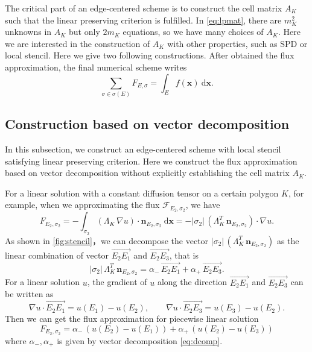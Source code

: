 \documentclass[times,review,preprint,authoryear]{elsarticle}
\newcommand{\bx}{\bm{x}}
\newcommand{\bn}{\bm{n}}
\begin{document}
The critical part of an edge-centered scheme is to construct the cell matrix $A_K$ such that the linear preserving criterion is fulfilled. In \cref{eq:lpmat}, there are $m_K^2$ unknowns in $A_K$ but only $2 m_K$ equations, so we have many choices of $A_K$. Here we are interested in the construction of $A_K$ with other properties, such as SPD or local stencil. Here we give two following constructions. After obtained the flux approximation, the final numerical scheme writes
\begin{equation}\label{eq:final}
\sum_{\sigma \in \sigma(E)} F_{E, \sigma} = \int_{E} f(\bx) \ \mathrm{d} \bx.
\end{equation}

\subsection{Construction based on vector decomposition}

In this subsection, we construct an edge-centered scheme with local stencil satisfying linear preserving criterion. Here we construct the flux approximation based on vector decomposition without explicitly establishing the cell matrix $A_K$. 

For a linear solution with a constant diffusion tensor on a certain polygon $K$, for example, when we approximating the flux $\mathcal{F}_{E_{2}, \sigma_{2}}$, we have
\begin{equation}\label{numflux}
F_{E_{2}, \sigma_{2}} = - \int_{\sigma_{2}} (\Lambda_K \, \nabla u) \cdot \bn_{E_{2}, \sigma_{2}} \ \mathrm{d} \bx = - |\sigma_{2}| \, (\Lambda_K^T \, \bn_{E_{2}, \sigma_{2}}) \cdot \nabla u.
\end{equation}
As shown in \cref{fig:stencil}，we can decompose the vector $|\sigma_{2}| \, (\Lambda_K^T \, \bn_{E_{2}, \sigma_{2}})$ as the linear combination of vector $\overrightarrow{E_{2} E_{1}}$ and $\overrightarrow{E_{2} E_{3}}$, that is
\begin{equation}\label{eq:dcomp}
|\sigma_{2}| \, \Lambda_K^T \, \bn_{E_{2}, \sigma_{2}} = \alpha_{-} \, \overrightarrow{E_{2} E_{1}} + \alpha_{+} \, \overrightarrow{E_{2} E_{3}}.
\end{equation}
For a linear solution $u$, the gradient of $u$ along the direction  $\overrightarrow{E_{2} E_{1}}$ and $\overrightarrow{E_{2} E_{3}}$ can be written as
\begin{equation*}
\nabla u \cdot \overrightarrow{E_{2} E_{1}} = u(E_{1}) - u(E_{2}), \qquad \nabla u \cdot \overrightarrow{E_{2} E_{3}} = u(E_{3}) - u(E_{2}).
\end{equation*}
Then we can get the flux approximation for piecewise linear solution
\begin{equation*}
F_{E_{2}, \sigma_{2}} = \alpha_{-} \, (u(E_{2}) - u(E_{1})) + \alpha_{+} \, (u(E_{2}) - u(E_{3}))
\end{equation*}
where $\alpha_{-}, \alpha_{+}$ is given by vector decomposition \cref{eq:dcomp}.
\end{document}
